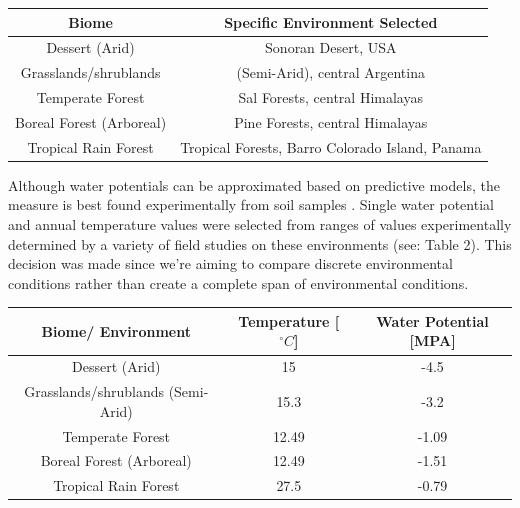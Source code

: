 \documentclass[12pt]{article}
\begin{document}
\begin{savenotes}
	\begin{table}[H]
		\begin{center}
			\begin{tabular}{|c c|} 
				\hline
				Biome & Specific Environment Selected \\ [0.5ex] 
				\hline\hline
				Dessert (Arid) & Sonoran Desert, USA \\ 
				\hline
				Grasslands/shrublands & (Semi-Arid), central Argentina\\
				\hline
				Temperate Forest & Sal Forests, central Himalayas\\
				\hline
				Boreal Forest (Arboreal) & Pine Forests, central Himalayas\\
				\hline
				Tropical Rain Forest & Tropical Forests, Barro Colorado Island, Panama \\
				\hline
			\end{tabular}
			\vspace*{-3ex}
			\label{table1}
		\end{center}
	\end{table}
\end{savenotes}

Although water potentials can be approximated based on predictive models, the measure is best found experimentally from soil samples \cite{Abkenar2019}. Single water potential and annual temperature values were selected from ranges of values experimentally determined by a variety of field studies on these environments (see: Table 2). This decision was made since we're aiming to compare discrete environmental conditions rather than create a complete span of environmental conditions.

\begin{table}[H]
	\begin{center}
		\begin{tabular}{|c c c|} 
			\hline
			Biome/ Environment & Temperature [$^{\circ}C$] & Water Potential [MPA]\\ [0.5ex] 
			\hline\hline
			Dessert (Arid) & 15 & -4.5 \\ 
			\hline
			Grasslands/shrublands (Semi-Arid) &15.3 & -3.2\\
			\hline
			Temperate Forest & 12.49 & -1.09 \\
			\hline
			Boreal Forest (Arboreal)& 12.49 &  -1.51 \\
			\hline
			Tropical Rain Forest & 27.5 & -0.79 \\
			\hline
		\end{tabular}
		\vspace*{-3ex}
		\label{table2}
	\end{center}
\end{table}
\end{document}
